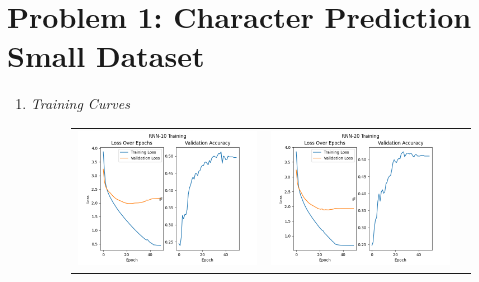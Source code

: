 \documentclass{article}
\begin{document}


\section{Problem 1: Character Prediction Small Dataset}

\begin{enumerate}[label=1\alph*. ]
    \item \textit{Training Curves}
    \begin{figure}[htb]
        \setlength\tabcolsep{2pt}
        \begin{tabularx}{\textwidth}{XXX}
          \includegraphics{images_p1/RNN_10_training_new.png} &
          \includegraphics{images_p1/RNN_20_training_new.png} &

\end{tabularx}
\end{figure}
\end{enumerate}
\end{document}
